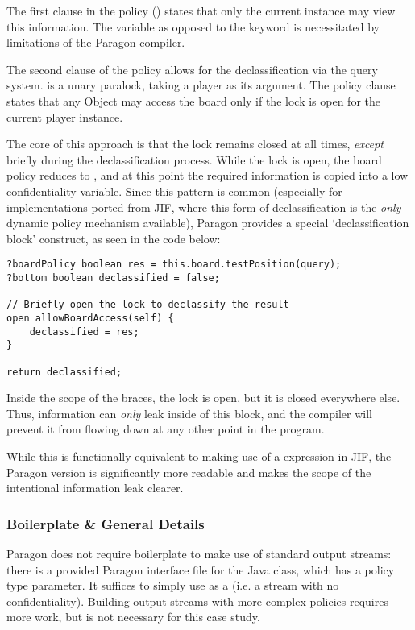 The first clause in the policy () states that only the current instance may view this information. The  variable as opposed to the  keyword is necessitated by limitations of the Paragon compiler.

The second clause of the policy allows for the declassification via the query system.  is a unary paralock, taking a player as its argument. The policy clause states that any Object  may access the board only if the  lock is open for the current player instance.

The core of this approach is that the lock remains closed at all times, \textit{except} briefly during the declassification process. While the lock is open, the board policy reduces to , and at this point the required information is copied into a low confidentiality variable. Since this pattern is common (especially for implementations ported from JIF, where this form of declassification is the \textit{only} dynamic policy mechanism available), Paragon provides a special `declassification block' construct, as seen in the code below:

\begin{verbatim}
?boardPolicy boolean res = this.board.testPosition(query);
?bottom boolean declassified = false;

// Briefly open the lock to declassify the result
open allowBoardAccess(self) {
	declassified = res;
}

return declassified;
\end{verbatim}

Inside the scope of the braces, the lock is open, but it is closed everywhere else. Thus, information can \textit{only} leak inside of this block, and the compiler will prevent it from flowing down at any other point in the program.

While this is functionally equivalent to making use of a  expression in JIF, the Paragon version is significantly more readable and makes the scope of the intentional information leak clearer.

\subsubsection{Boilerplate \& General Details}

Paragon does not require boilerplate to make use of standard output streams: there is a provided Paragon interface file for the Java  class, which has a policy type parameter. It suffices to simply use  as a  (i.e. a stream with no confidentiality). Building output streams with more complex policies requires more work, but is not necessary for this case study.

